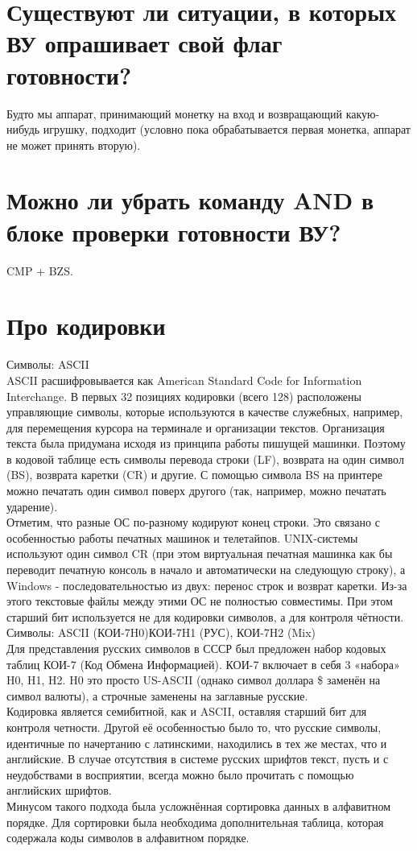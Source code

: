 \section{Существуют ли ситуации, в которых ВУ опрашивает свой флаг готовности?}
Будто мы аппарат, принимающий монетку на вход и возвращающий какую-нибудь игрушку, подходит (условно пока обрабатывается первая монетка, аппарат не может принять вторую).
\section{Можно ли убрать команду AND в блоке проверки готовности ВУ?}
CMP + BZS.
\section{Про кодировки}
\noindent Символы: ASCII \\
\noindent ASCII расшифровывается как American Standard Code for Information Interchange. В первых 32 позициях кодировки (всего 128) расположены управляющие символы, которые используются в качестве служебных, например, для перемещения курсора на терминале и организации текстов.
Организация текста была придумана исходя из принципа работы пишущей машинки. Поэтому в кодовой таблице есть символы перевода строки (LF), возврата на один символ (BS), возврата каретки (CR) и другие. С помощью символа BS на принтере можно печатать один символ поверх другого (так, например, можно печатать ударение). \\
Отметим, что разные ОС по-разному кодируют конец строки. Это связано с особенностью работы печатных машинок и телетайпов. UNIX-системы используют один символ CR (при этом виртуальная печатная машинка как бы переводит печатную консоль в начало и автоматически на следующую строку), а Windows - последовательностью из двух: перенос строк и возврат каретки. Из-за этого текстовые файлы между этими ОС не полностью совместимы. При этом старший бит используется не для кодировки символов, а для контроля чётности. \\

\noindent Символы: ASCII (КОИ-7H0)КОИ-7H1 (РУС), КОИ-7H2 (Mix) \\
Для представления русских символов в СССР был предложен набор кодовых таблиц КОИ-7 (Код Обмена Информацией). КОИ-7 включает в себя 3 «набора» H0, H1, H2. H0 это просто US-ASCII (однако символ доллара \$ заменён на символ валюты), а строчные заменены на заглавные русские. \\
Кодировка является семибитной, как и ASCII, оставляя старший бит для контроля четности. Другой её особенностью было то, что русские символы, идентичные по начертанию с латинскими, находились в тех же местах, что и английские. В случае отсутствия в системе русских шрифтов текст, пусть и с неудобствами в восприятии, всегда можно было прочитать с помощью английских шрифтов. \\
Минусом такого подхода была усложнённая сортировка данных в алфавитном порядке. Для сортировки была необходима дополнительная таблица, которая содержала коды символов в алфавитном порядке. \\

